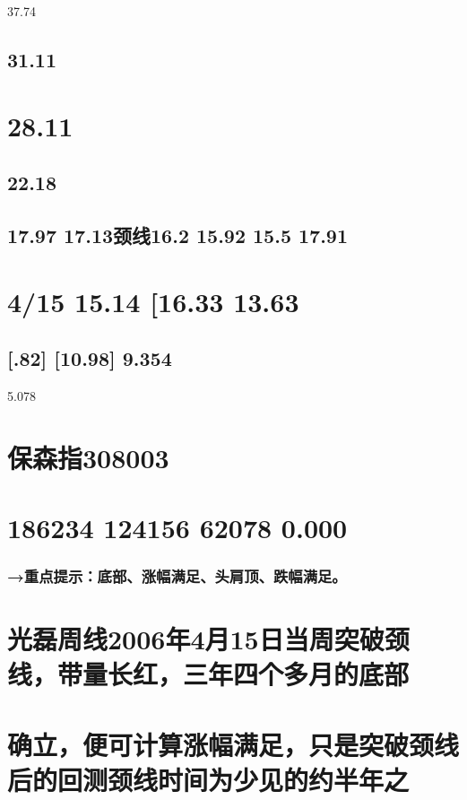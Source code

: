 \documentclass{article}
\begin{document}
37.74

\subsection{31.11}

\section{28.11}

\subsection{22.18}

\subsection{17.97 17.13颈线16.2 15.92 15.5 17.91}

\section{4/15 15.14 [16.33 13.63}

\subsection{[.82] [10.98] 9.354}

5.078

\section{保森指308003}

\section{186234 124156 62078 0.000}

\subsubsection{→重点提示：底部、涨幅满足、头肩顶、跌幅满足。}

\section{光磊周线2006年4月15日当周突破颈线，带量长红，三年四个多月的底部}

\section{确立，便可计算涨幅满足，只是突破颈线后的回测颈线时间为少见的约半年之}
\end{document}
